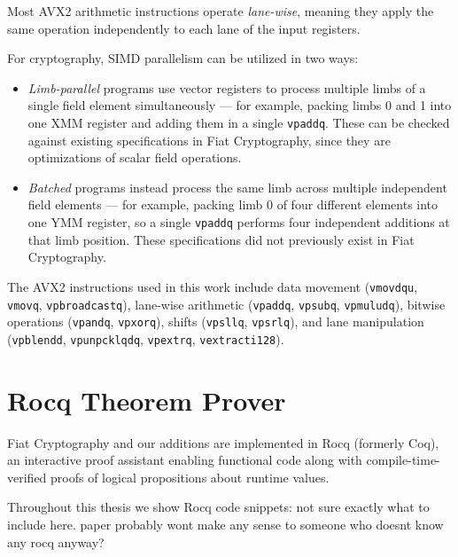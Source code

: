 Most AVX2 arithmetic instructions operate \emph{lane-wise}, meaning they apply the same operation independently to each lane of the input registers.

For cryptography, SIMD parallelism can be utilized in two ways:

\begin{itemize}
    \item \emph{Limb-parallel} programs use vector registers to process multiple limbs of a single field element simultaneously --- for example, packing limbs 0 and 1 into one XMM register and adding them in a single \texttt{vpaddq}. These can be checked against existing specifications in Fiat Cryptography, since they are optimizations of scalar field operations.
    \item \emph{Batched} programs instead process the same limb across multiple independent field elements --- for example, packing limb 0 of four different elements into one YMM register, so a single \texttt{vpaddq} performs four independent additions at that limb position. These specifications did not previously exist in Fiat Cryptography.
\end{itemize}

The AVX2 instructions used in this work include data movement (\texttt{vmovdqu}, \texttt{vmovq}, \texttt{vpbroadcastq}), lane-wise arithmetic (\texttt{vpaddq}, \texttt{vpsubq}, \texttt{vpmuludq}), bitwise operations (\texttt{vpandq}, \texttt{vpxorq}), shifts (\texttt{vpsllq}, \texttt{vpsrlq}), and lane manipulation (\texttt{vpblendd}, \texttt{vpunpcklqdq}, \texttt{vpextrq}, \texttt{vextracti128}).



\section{Rocq Theorem Prover}

Fiat Cryptography and our additions are implemented in Rocq (formerly Coq), an interactive proof assistant enabling functional code along with compile-time-verified proofs of logical propositions about runtime values.

Throughout this thesis we show Rocq code snippets: 
{not sure exactly what to include here. paper probably wont make any sense to someone who doesnt know any rocq anyway?}

